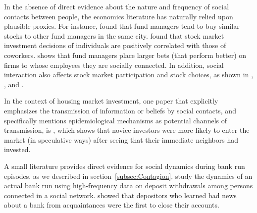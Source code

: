 In the absence of direct evidence about the nature and frequency of social contacts between people, the economics literature has naturally relied upon plausible proxies.   For instance,  \href{http://www.columbia.edu/~hh2679/ThyNeighborJF.pdf}{\cite{hong2005thy}} found that fund managers tend to buy similar stocks to other fund managers in the same city. \href{https://github.com/iworld1991/EpiExp/blob/master/Literature/hvide2015social.pdf}{\cite{hvide2015social}} found that stock market investment decisions of individuals are positively correlated with those of coworkers.  \href{https://www.jstor.org/stable/10.1086/592415}{\cite{cohen2008small}} shows that fund managers place larger bets (that perform better) on firms to whose employees they are socially connected.  In addition, social interaction also affects stock market participation and stock choices, as shown in  \href{https://github.com/iworld1991/EpiExp/blob/master/Literature/hong2004social.pdf}{\cite{hong2004social}}, \href{https://onlinelibrary.wiley.com/doi/abs/10.1111/j.1540-6261.2008.01364.x}{\cite{brown2008neighbors}}, and \href{https://github.com/iworld1991/EpiExp/blob/master/Literature/ivkovic2007information.pdf}{\cite{ivkovic2007information}}. %

In the context of housing market investment, one paper that explicitly emphasizes the transmission of information or beliefs by social contacts, and specifically mentions epidemiological mechanisms as potential channels of transmission, is
 \href{https://www.aeaweb.org/articles?id=10.1257/aer.20171611&from=f}{\cite{bayer2021speculative}}, which shows that novice investors were more likely to enter the market (in speculative ways) after seeing that their immediate neighbors had invested.


A small literature provides direct evidence for social dynamics during bank run episodes, as we described in section~\ref{subsec:Contagion}.  \href{https://www.aeaweb.org/articles?id=10.1257/aer.102.4.1414}{\cite{iyer2012understanding}} study the dynamics of an actual bank run using high-frequency data on deposit withdrawals among persons connected in a social network.   \href{https://www.aeaweb.org/articles?id=10.1257/aer.90.5.1110}{\cite{kelly2000market}} showed that depositors who learned bad news about a bank from acquaintances were the first to close their accounts.

